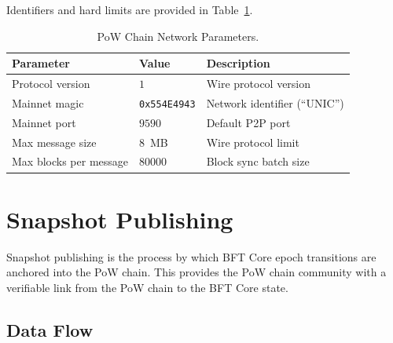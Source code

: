 Identifiers and hard limits are provided in Table~\ref{ta:pow-network}.

\begin{table}[!htbp]
  \begin{center}
    \caption{PoW Chain Network Parameters.}\label{ta:pow-network}
    \begin{tabular}{|p{5cm}|p{4cm}|p{4.5cm}|}\hline
      Parameter & Value & Description \\\hline\hline
      Protocol version & $1$ & Wire protocol version \\\hline
      Mainnet magic & \texttt{0x554E4943} & Network identifier (``UNIC'') \\\hline
      Mainnet port & $9590$ & Default P2P port \\\hline
      Max message size & $8$~MB & Wire protocol limit \\\hline
      Max blocks per message & $80000$ & Block sync batch size \\\hline
    \end{tabular}
  \end{center}
\end{table}


\section{Snapshot Publishing}\label{sec:snapshot-publishing}

Snapshot publishing is the process by which BFT Core epoch transitions are anchored into the PoW chain. This provides the PoW chain community with a verifiable link from the PoW chain to the BFT Core state.

\subsection{Data Flow}\label{sec:snapshot-dataflow}

